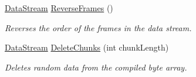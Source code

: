 \begin{DoxyCompactItemize}
\hyperlink{classvcvj_1_1_models_1_1_grammatical___components_1_1_data_stream}{Data\+Stream} \hyperlink{classvcvj_1_1_models_1_1_grammatical___components_1_1_data_stream_acc25a5965b38129773a783f6f73531d0}{Reverse\+Frames} ()
\begin{DoxyCompactList}\small\item\em Reverses the order of the frames in the data stream. \end{DoxyCompactList}\item 
\hyperlink{classvcvj_1_1_models_1_1_grammatical___components_1_1_data_stream}{Data\+Stream} \hyperlink{classvcvj_1_1_models_1_1_grammatical___components_1_1_data_stream_a5b0888f317857e784b4bc54f9d3b6a0f}{Delete\+Chunks} (int chunk\+Length)
\begin{DoxyCompactList}\small\item\em Deletes random data from the compiled byte array. \end{DoxyCompactList}\end{DoxyCompactItemize}

